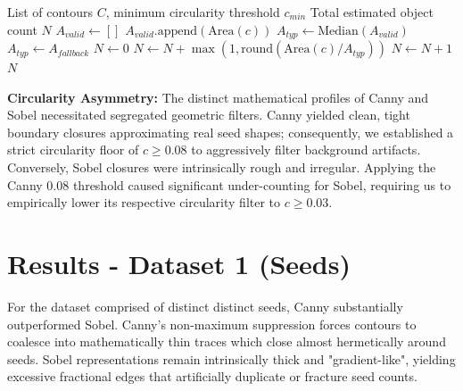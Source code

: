 \documentclass[11pt]{article}
\begin{document}
\begin{algorithm}[H]
\caption{Dynamic Area-Based Object Counting}\label{alg:occlusion}
\begin{algorithmic}[1]
\Require List of contours $C$, minimum circularity threshold $c_{min}$
\Ensure Total estimated object count $N$
\State $A_{valid} \gets []$ 
        \State $A_{valid}\text{.append}(\text{Area}(c))$
    \EndIf
\EndFor
{}
    \State $A_{typ} \gets \text{Median}(A_{valid})$
\Else
    \State $A_{typ} \gets A_{fallback}$
\EndIf
\State $N \gets 0$
     
        \State $N \gets N + \max(1, \text{round}(\text{Area}(c) / A_{typ}))$
     
        \State $N \gets N + 1$
    \EndIf
\EndFor
\State \Return $N$
\end{algorithmic}
\end{algorithm}

\textbf{Circularity Asymmetry:} The distinct mathematical profiles of Canny and Sobel necessitated segregated geometric filters. Canny yielded clean, tight boundary closures approximating real seed shapes; consequently, we established a strict circularity floor of $c \ge 0.08$ to aggressively filter background artifacts. Conversely, Sobel closures were intrinsically rough and irregular. Applying the Canny $0.08$ threshold caused significant under-counting for Sobel, requiring us to empirically lower its respective circularity filter to $c \ge 0.03$.

\section{Results - Dataset 1 (Seeds)}

For the dataset comprised of distinct distinct seeds, Canny substantially outperformed Sobel. Canny's non-maximum suppression forces contours to coalesce into mathematically thin traces which close almost hermetically around seeds. Sobel representations remain intrinsically thick and "gradient-like", yielding excessive fractional edges that artificially duplicate or fracture seed counts.
\end{document}
